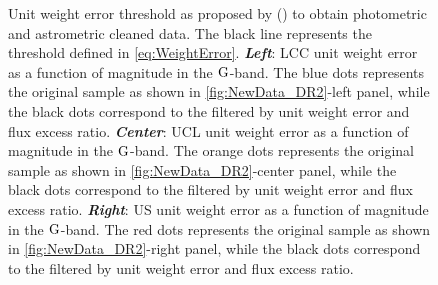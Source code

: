 \begin{figure}[!ht]
\centering
\caption{\scriptsize{Unit weight error threshold as proposed by  (\citeyear{2016ApJS..222....8D}) to obtain photometric and astrometric cleaned data. The black line represents the threshold defined in \autoref{eq:WeightError}. \textit{\textbf{Left}}: LCC unit weight error as a function of magnitude in the $\textnormal{G}$-band. The blue dots represents the original sample as shown in \autoref{fig:NewData_DR2}-left panel, while the black dots correspond to the filtered by unit weight error and flux excess ratio. \textit{\textbf{Center}}: UCL unit weight error as a function of magnitude in the $\textnormal{G}$-band. The orange dots represents the original sample as shown in \autoref{fig:NewData_DR2}-center panel, while the black dots correspond to the filtered by unit weight error and flux excess ratio. \textit{\textbf{Right}}: US unit weight error as a function of magnitude in the $\textnormal{G}$-band. The red dots represents the original sample as shown in \autoref{fig:NewData_DR2}-right panel, while the black dots correspond to the filtered by unit weight error and flux excess ratio.}}
\label{fig:LindegrenSelection}
\end{figure}

